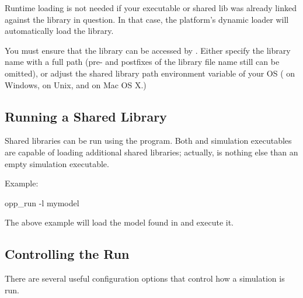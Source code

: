 \begin{note}
  Runtime loading is not needed if your executable or shared lib was
  already linked against the library in question. In that case,
  the platform's dynamic loader will automatically load the library.
\end{note}

\begin{note}
  You must ensure that the library can be accessed by {\opp}. Either specify the
  library name with a full path (pre- and postfixes of the library file name
  still can be omitted), or adjust the shared library path environment variable
  of your OS ( on Windows,  on Unix, and
   on Mac OS X.)
\end{note}

\subsection{Running a Shared Library}

Shared libraries can be run using the  program.
Both  and simulation executables are capable of
loading additional shared libraries; actually, 
is nothing else than an empty simulation executable.

Example:
\begin{commandline}
opp_run -l mymodel
\end{commandline}

The above example will load the model found in  and execute it.

\subsection{Controlling the Run}

There are several useful configuration options that control how a simulation is run.

